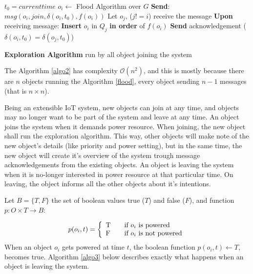 \documentclass[../main/IoT.tex]{subfiles}
\begin{document}
\LinesNumbered
\IncMargin{1em}
\begin{algorithm}
$t_{0} = current time$
\BlankLine
$o_{i} \gets$ Flood Algorithm over $G$ \newline
\textbf{Send}: $msg(o_{i}, join, \delta(o_{i}, t_{0}), f(o_{i}))$
\BlankLine
{} {
    Let $o_{j}$, ($j!=i$) receive the message
    \BlankLine
    \textbf{Upon} receiving message:\newline
    {
       \textbf{Insert} $o_{i}$ in $Q_{j}$ \textbf{in order} of $f(o_{i})$
       \BlankLine
       \textbf{Send} acknowledgement ($\delta(o_{i},t_{0}) = \delta(o_{j},t_{0})$)
    }
}
\caption{\textbf{Exploration Algorithm} run by all object joining the system} \label{algo2}
\end{algorithm}
\DecMargin{1em}

The Algorithm \ref{algo2} has complexity $\mathcal{O}(n^2)$, and this is mostly because there are $n$ objects running the Algorithm \ref{flood}, every object sending $n-1$ messages (that is $n\times n$).

Being an extensible IoT system, new objects can join at any time, and objects may no longer want to be part of the system and leave at any time. An object joins the system when it demands power resource. When joining, the new object shall run the exploration algorithm. This way, other objects will make note of the new object's details (like priority and power setting), but in the same time, the new object will create it's overview of the system trough message acknowledgements from the existing objects. An object is leaving the system when it is no-longer interested in power resource at that particular time. On leaving, the object informs all the other objects about it's intentions.

Let $B = \{T,F\}$ the set of boolean values true ($T$) and false ($F$), and function $p:O\times T \rightarrow B$:

  \[ p(o_{i}, t)= \left\{
  \begin{array}{l l}
    $T$ & \quad \textrm{if $o_{i}$ is powered}\\
    $F$ & \quad \textrm{if $o_{i}$ is not powered}
  \end{array} \right.\]
When an object $o_{i}$ gets powered at time $t$, the boolean function $p(o_{i},t) \gets T$, becomes true. Algorithm \ref{algo3} below describes exactly what happens when an object is leaving the system.
\end{document}
